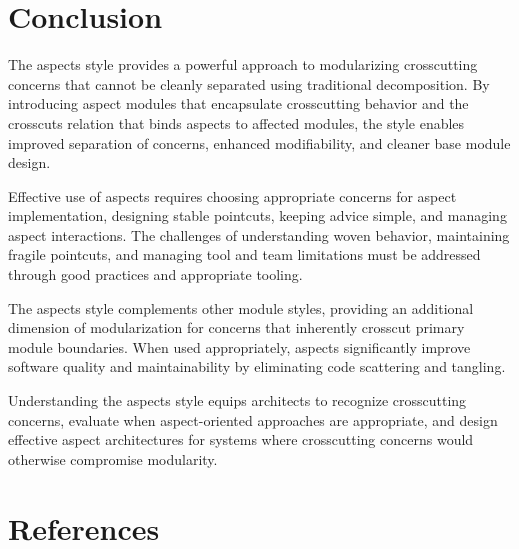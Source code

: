 \documentclass[11pt]{article}
\begin{document}
\section{Conclusion}

The aspects style provides a powerful approach to modularizing crosscutting concerns that cannot be cleanly separated using traditional decomposition. By introducing aspect modules that encapsulate crosscutting behavior and the crosscuts relation that binds aspects to affected modules, the style enables improved separation of concerns, enhanced modifiability, and cleaner base module design.

Effective use of aspects requires choosing appropriate concerns for aspect implementation, designing stable pointcuts, keeping advice simple, and managing aspect interactions. The challenges of understanding woven behavior, maintaining fragile pointcuts, and managing tool and team limitations must be addressed through good practices and appropriate tooling.

The aspects style complements other module styles, providing an additional dimension of modularization for concerns that inherently crosscut primary module boundaries. When used appropriately, aspects significantly improve software quality and maintainability by eliminating code scattering and tangling.

Understanding the aspects style equips architects to recognize crosscutting concerns, evaluate when aspect-oriented approaches are appropriate, and design effective aspect architectures for systems where crosscutting concerns would otherwise compromise modularity.

\section*{References}
\end{document}
